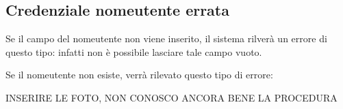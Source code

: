 {    \subsection{Credenziale nomeutente errata} {
        Se il campo del nomeutente non viene inserito, il sistema rilverà un errore di questo tipo: infatti non è possibile lasciare 
        tale campo vuoto.

        Se il nomeutente non esiste, verrà rilevato questo tipo di errore: 

        INSERIRE LE FOTO, NON CONOSCO ANCORA BENE LA PROCEDURA
    }
}
